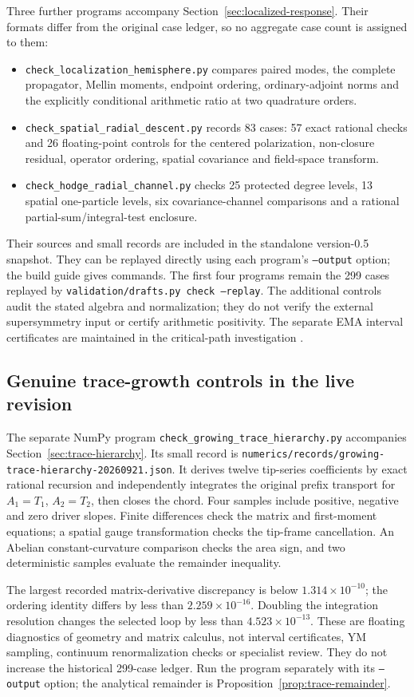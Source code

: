 Three further programs accompany Section~\ref{sec:localized-response}.
Their formats differ from the original case ledger, so no aggregate
case count is assigned to them:
\begin{itemize}
 \item \nolinkurl{check_localization_hemisphere.py} compares paired
 modes, the complete propagator, Mellin moments, endpoint ordering,
 ordinary-adjoint norms and the explicitly conditional arithmetic
 ratio at two quadrature orders.
 \item \nolinkurl{check_spatial_radial_descent.py} records 83 cases:
 57 exact rational checks and 26 floating-point controls for the
 centered polarization, non-closure residual, operator ordering,
 spatial covariance and field-space transform.
 \item \nolinkurl{check_hodge_radial_channel.py} checks 25 protected
 degree levels, 13 spatial one-particle levels, six covariance-channel
 comparisons and a rational partial-sum/integral-test enclosure.
\end{itemize}
Their sources and small records are included in the standalone
version-0.5 snapshot. They can be replayed directly using each
program's \texttt{--output} option; the build guide gives commands.
The first four programs remain the 299 cases replayed by
\texttt{validation/drafts.py check --replay}.
The additional controls audit the stated algebra and normalization;
they do not verify the external supersymmetry input or certify
arithmetic positivity. The separate EMA interval certificates are
maintained in the critical-path investigation \cite{EMAAnchor}.

\subsection{Genuine trace-growth controls in the live revision}

The separate NumPy program
\nolinkurl{check_growing_trace_hierarchy.py} accompanies
Section~\ref{sec:trace-hierarchy}. Its small record is
\nolinkurl{numerics/records/growing-trace-hierarchy-20260921.json}.
It derives twelve tip-series coefficients by exact rational
recursion and independently integrates the original prefix
transport for $A_1=T_1$, $A_2=T_2$, then closes the chord.
Four samples include positive, negative and zero driver slopes.
Finite differences check the matrix and first-moment equations;
a spatial gauge transformation checks the tip-frame cancellation.
An Abelian constant-curvature comparison checks the area sign,
and two deterministic samples evaluate the remainder inequality.

The largest recorded matrix-derivative discrepancy is below
$1.314\times10^{-10}$; the ordering identity differs by less than
$2.259\times10^{-16}$. Doubling the integration resolution changes
the selected loop by less than $4.523\times10^{-13}$. These are
floating diagnostics of geometry and matrix calculus, not interval
certificates, YM sampling, continuum renormalization checks or
specialist review. They do not increase the historical 299-case
ledger. Run the program separately with its \texttt{--output}
option; the analytical remainder is
Proposition~\ref{prop:trace-remainder}.
